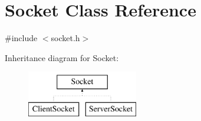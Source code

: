 \hypertarget{class_socket}{\section{Socket Class Reference}
\label{class_socket}
}


{\ttfamily \#include $<$socket.\-h$>$}

Inheritance diagram for Socket\-:\begin{figure}[H]
\begin{center}
\leavevmode
\includegraphics[height=2.000000cm]{class_socket}
\end{center}
\end{figure}
